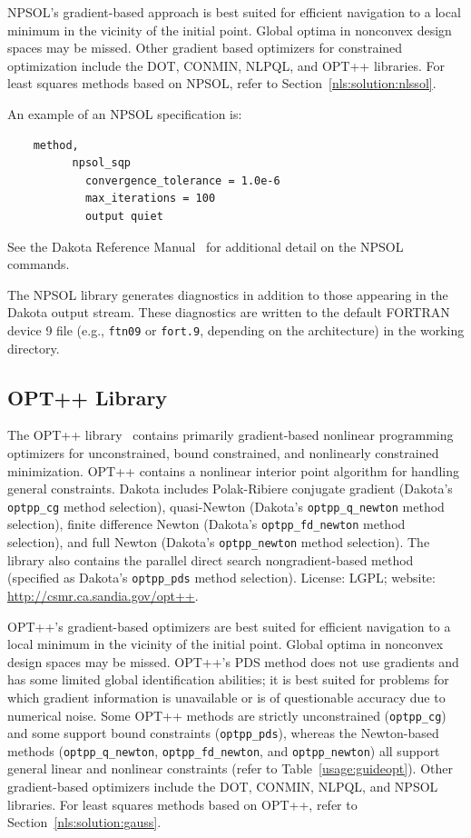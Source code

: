 NPSOL's gradient-based approach is best suited for efficient
navigation to a local minimum in the vicinity of the initial point.
Global optima in nonconvex design spaces may be missed. Other gradient
based optimizers for constrained optimization include the DOT, CONMIN,
NLPQL, and OPT++ libraries. For least squares methods based on NPSOL,
refer to Section~\ref{nls:solution:nlssol}.

An example of an NPSOL specification is:
\begin{small}
\begin{verbatim}
    method,
          npsol_sqp
            convergence_tolerance = 1.0e-6
            max_iterations = 100
            output quiet
\end{verbatim}
\end{small}

See the Dakota Reference Manual~\cite{RefMan} for additional detail on the
NPSOL commands. 

The NPSOL library generates diagnostics in addition to those appearing
in the Dakota output stream. These diagnostics are written to the
default FORTRAN device 9 file (e.g., \texttt{ftn09} or \texttt{fort.9},
depending on the architecture) in the working directory.

\subsection{OPT++ Library}\label{opt:software:optpp}

The OPT++ library~\cite{MeOlHoWi07} contains primarily gradient-based
nonlinear programming optimizers for unconstrained, bound constrained,
and nonlinearly constrained minimization.  OPT++ contains a nonlinear
interior point algorithm for handling general constraints.  Dakota
includes Polak-Ribiere conjugate gradient (Dakota's \texttt{optpp\_cg}
method selection), quasi-Newton (Dakota's \texttt{optpp\_q\_newton}
method selection), finite difference Newton (Dakota's
\texttt{optpp\_fd\_newton} method selection), and full Newton
(Dakota's \texttt{optpp\_newton} method selection). The library also
contains the parallel direct search nongradient-based
method~\cite{Den94b} (specified as Dakota's \texttt{optpp\_pds} method
selection).  License: LGPL; website:
\url{http://csmr.ca.sandia.gov/opt++}.

OPT++'s gradient-based optimizers are best suited for efficient
navigation to a local minimum in the vicinity of the initial point.
Global optima in nonconvex design spaces may be missed. OPT++'s PDS
method does not use gradients and has some limited global
identification abilities; it is best suited for problems for which
gradient information is unavailable or is of questionable accuracy due
to numerical noise. Some OPT++ methods are strictly unconstrained
(\texttt{optpp\_cg}) and some support bound constraints
(\texttt{optpp\_pds}), whereas the Newton-based methods
(\texttt{optpp\_q\_newton}, \texttt{optpp\_fd\_newton}, and
\texttt{optpp\_newton}) all support general linear and nonlinear
constraints (refer to Table~\ref{usage:guideopt}). Other
gradient-based optimizers include the DOT, CONMIN, NLPQL, and NPSOL
libraries. For least squares methods based on OPT++, refer to
Section~\ref{nls:solution:gauss}.

